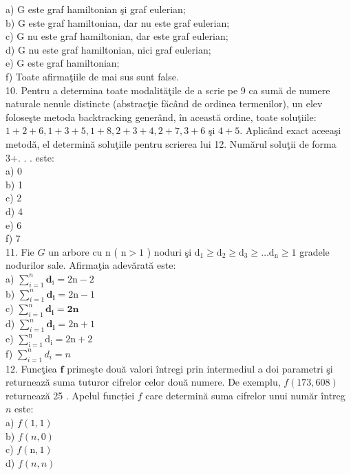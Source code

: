 \documentclass[10pt]{article}
\begin{document}
a) G este graf hamiltonian şi graf eulerian;\\
b) G este graf hamiltonian, dar nu este graf eulerian;\\
c) G nu este graf hamiltonian, dar este graf eulerian;\\
d) G nu este graf hamiltonian, nici graf eulerian;\\
e) G este graf hamiltonian;\\
f) Toate afirmaţiile de mai sus sunt false.\\
10. Pentru a determina toate modalităţile de a scrie pe 9 ca sumă de numere naturale nenule distincte (abstracţie făcând de ordinea termenilor), un elev foloseşte metoda backtracking generând, în această ordine, toate soluţiile: $1+2+6,1+3+5,1+8,2+3+4,2+7,3+6$ şi $4+5$. Aplicând exact aceeaşi metodă, el determină soluţiile pentru scrierea lui 12. Numărul soluţii de forma 3+. . . este:\\
a) 0\\
b) 1\\
c) 2\\
d) 4\\
e) 6\\
f) 7\\
11. Fie $G$ un arbore cu n ( $\mathrm{n}>1$ ) noduri şi $\mathrm{d}_{1} \geq \mathrm{d}_{2} \geq \mathrm{d}_{3} \geq \ldots \mathrm{d}_{\mathrm{n}} \geq 1$ gradele nodurilor sale. Afirmaţia adevărată este:\\
a) $\sum_{i=1}^{n} \mathbf{d}_{\mathrm{i}}=2 \mathrm{n}-2$\\
b) $\sum_{i=1}^{n} \mathbf{d}_{\mathbf{i}}=2 \mathrm{n}-1$\\
c) $\sum_{i=1}^{n} \mathbf{d}_{\mathbf{i}}=\mathbf{2 n}$\\
d) $\sum_{i=1}^{n} \mathbf{d}_{\mathbf{i}}=2 \mathrm{n}+1$\\
e) $\sum_{\mathrm{i}=1}^{\mathrm{n}} \mathrm{d}_{\mathrm{i}}=2 \mathrm{n}+2$\\
f) $\sum_{i=1}^{n} d_{i}=n$\\
12. Funcţiea $\mathbf{f}$ primeşte două valori întregi prin intermediul a doi parametri şi returnează suma tuturor cifrelor celor două numere. De exemplu, $f(173,608)$ returnează 25 . Apelul funcției $f$ care determină suma cifrelor unui număr întreg $n$ este:\\
a) $f(1,1)$\\
b) $f(n, 0)$\\
c) $f(\mathrm{n}, 1)$\\
d) $f(n, n)$\\
\end{document}
